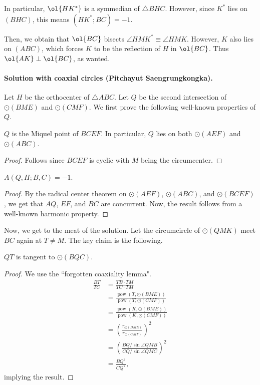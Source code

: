In particular, $\ol{HK^\ast}$ is a symmedian of $\triangle BHC$.
However, since $K^\ast$ lies on $(BHC)$,
this means $(HK^\ast; BC) = -1$.

Then, we obtain that $\ol{BC}$ bisects $\angle HMK^\ast \equiv \angle HMK$.
However, $K$ also lies on $(ABC)$,
which forces $K$ to be the reflection of $H$ in $\ol{BC}$.
Thus $\ol{AK} \perp \ol{BC}$, as wanted.

\paragraph{Solution with coaxial circles (Pitchayut Saengrungkongka).}

Let $H$ be the orthocenter of $\triangle ABC$. Let $Q$ be the second intersection of $\odot(BME)$ and $\odot(CMF)$.
We first prove the following well-known properties of $Q$.
\begin{claim*}
$Q$ is the Miquel point of $BCEF$. In particular, $Q$ lies on both $\odot(AEF)$ and $\odot(ABC)$.
\end{claim*}

\begin{proof}
  Follows since $BCEF$ is cyclic with $M$ being the circumcenter.
\end{proof}

\begin{claim*}
  $A(Q,H;B, C) = -1$.
\end{claim*}

\begin{proof}
By the radical center theorem on $\odot(AEF)$, $\odot(ABC)$, and $\odot(BCEF)$,
we get that $AQ$, $EF$, and $BC$ are concurrent. Now, the result follows from a
well-known harmonic property.
\end{proof}

Now, we get to the meat of the solution. Let the circumcircle of
$\odot(QMK)$ meet $BC$ again at $T\neq M$. The key claim is the following.
\begin{claim*}
$QT$ is tangent to $\odot(BQC)$.
\end{claim*}
\begin{proof}
    We use the ``forgotten coaxiality lemma".
    \begin{align*}
	\frac{BT}{TC} &= \frac{TB\cdot TM}{TC\cdot TM} \\
		      &= \frac{\operatorname{pow}(T, \odot(BME))}
		      {\operatorname{pow}(T, \odot(CMF))} \\
		      &= \frac{\operatorname{pow}(K, \odot(BME))}
		      {\operatorname{pow}(K, \odot(CMF))} \\
      &= \left(\frac{r_{\odot(BME)}}{r_{\odot(CMF)}}\right)^2 \\
	&= \left(\frac{BQ/\sin\angle QMB}{CQ/\sin\angle QMC}\right)^2 \\
	&= \frac{BQ^2}{CQ^2},
\end{align*}
implying the result.
\end{proof}

